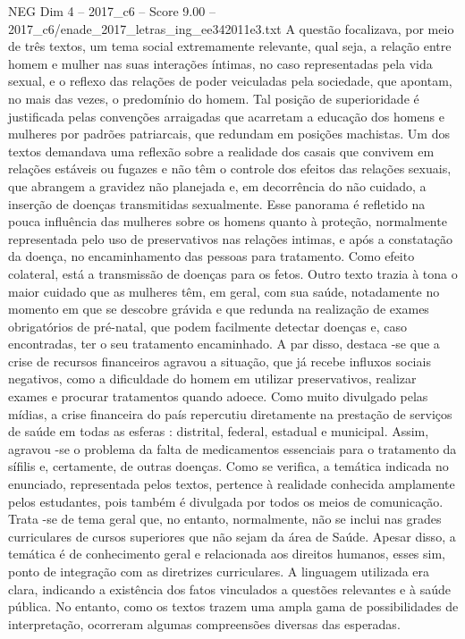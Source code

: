 \begin{textsample}{NEG Dim 4 – 2017\_c6 – Score 9.00 – 2017\_c6/enade\_2017\_letras\_ing\_ee342011e3.txt}
A questão focalizava, por meio de três textos, um tema social extremamente relevante, qual seja, a relação entre homem e mulher nas suas interações íntimas, no caso representadas pela vida sexual, e o reflexo das relações de poder veiculadas pela sociedade, que apontam, no mais das vezes, o predomínio do homem.
Tal posição de superioridade é justificada pelas convenções arraigadas que acarretam a educação dos homens e mulheres por padrões patriarcais, que redundam em posições machistas.
Um dos textos demandava uma reflexão sobre a realidade dos casais que convivem em relações estáveis ou fugazes e não têm o controle dos efeitos das relações sexuais, que abrangem a gravidez não planejada e, em decorrência do não cuidado, a inserção de doenças transmitidas sexualmente.
Esse panorama é refletido na pouca influência das mulheres sobre os homens quanto à proteção, normalmente representada pelo uso de preservativos nas relações intimas, e após a constatação da doença, no encaminhamento das pessoas para tratamento.
Como efeito colateral, está a transmissão de doenças para os fetos.
Outro texto trazia à tona o maior cuidado que as mulheres têm, em geral, com sua saúde, notadamente no momento em que se descobre grávida e que redunda na realização de exames obrigatórios de pré-natal, que podem facilmente detectar doenças e, caso encontradas, ter o seu tratamento encaminhado.
A par disso, destaca -se que a crise de recursos financeiros agravou a situação, que já recebe influxos sociais negativos, como a dificuldade do homem em utilizar preservativos, realizar exames e procurar tratamentos quando adoece.
Como muito divulgado pelas mídias, a crise financeira do país repercutiu diretamente na prestação de serviços de saúde em todas as esferas : distrital, federal, estadual e municipal.
Assim, agravou -se o problema da falta de medicamentos essenciais para o tratamento da sífilis e, certamente, de outras doenças.
Como se verifica, a temática indicada no enunciado, representada pelos textos, pertence à realidade conhecida amplamente pelos estudantes, pois também é divulgada por todos os meios de comunicação.
Trata -se de tema geral que, no entanto, normalmente, não se inclui nas grades curriculares de cursos superiores que não sejam da área de Saúde.
Apesar disso, a temática é de conhecimento geral e relacionada aos direitos humanos, esses sim, ponto de integração com as diretrizes curriculares.
A linguagem utilizada era clara, indicando a existência dos fatos vinculados a questões relevantes e à saúde pública.
No entanto, como os textos trazem uma ampla gama de possibilidades de interpretação, ocorreram algumas compreensões diversas das esperadas.

\end{textsample}
